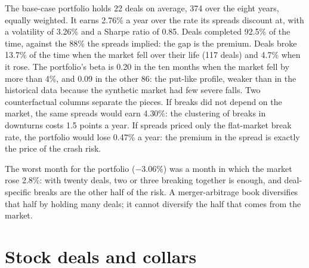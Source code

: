 The base-case portfolio holds 22 deals on average, 374 over the eight years, equally weighted. It earns 2.76\% a year over the rate its spreads discount at,
with a volatility of 3.26\% and a Sharpe ratio of 0.85. Deals completed 92.5\% of the time, against the 88\% the spreads implied: the gap is the premium. Deals
broke 13.7\% of the time when the market fell over their life (117 deals) and 4.7\% when it rose. The portfolio's beta is 0.20 in the ten months when the
market fell by more than 4\%, and 0.09 in the other 86: the put-like profile, weaker than in the historical data because the synthetic market had few
severe falls. Two counterfactual columns separate the pieces. If breaks did not depend on the market, the same spreads would earn 4.30\%: the clustering
of breaks in downturns costs 1.5 points a year. If spreads priced only the flat-market break rate, the portfolio would lose 0.47\% a year: the premium in
the spread is exactly the price of the crash risk.

\begin{omfigure}

\label{fig:s1:merger-arbitrage:months}
\end{omfigure}

The worst month for the portfolio ($-3.06\%$) was a month in which the market rose 2.8\%: with twenty deals, two or three breaking together is enough, and
deal-specific breaks are the other half of the risk. A merger-arbitrage book diversifies that half by holding many deals; it cannot diversify the half that
comes from the market.

\section{Stock deals and collars}

